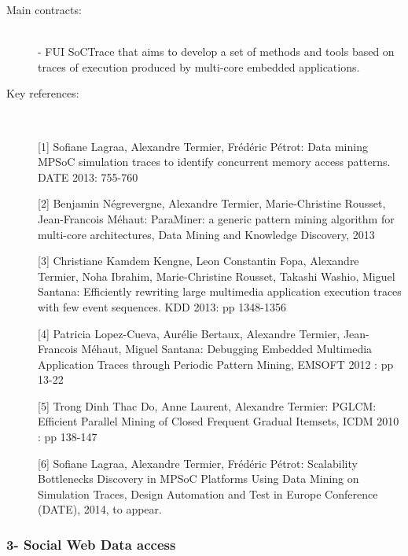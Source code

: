 \begin{description}

\item[Main contracts:] \ \\
- FUI SoCTrace that  aims to develop a set of methods and tools based on traces of execution produced by multi-core embedded applications. 
  
\item[Key references:]~%

[1] Sofiane Lagraa, Alexandre Termier, Fr{\'e}d{\'e}ric P{\'e}trot: Data mining MPSoC simulation traces to identify concurrent memory access patterns. DATE 2013: 755-760

[2] Benjamin N{\'e}grevergne, Alexandre Termier, Marie-Christine Rousset, Jean-Francois M{\'e}haut: ParaMiner: a generic pattern mining algorithm for multi-core architectures, Data Mining and Knowledge Discovery, 2013

[3] Christiane Kamdem Kengne, Leon Constantin Fopa, Alexandre Termier, Noha Ibrahim, Marie-Christine Rousset, Takashi Washio, Miguel Santana: Efficiently rewriting large multimedia application execution traces with few event sequences. KDD 2013: pp 1348-1356

[4] Patricia Lopez-Cueva, Aur{\'e}lie Bertaux, Alexandre Termier, Jean-Francois M{\'e}haut, Miguel Santana: Debugging Embedded Multimedia Application Traces through Periodic Pattern Mining, EMSOFT 2012 : pp 13-22

[5] Trong Dinh Thac Do, Anne Laurent, Alexandre Termier: PGLCM: Efficient Parallel Mining of Closed Frequent Gradual Itemsets, ICDM 2010 : pp 138-147

[6] Sofiane Lagraa, Alexandre Termier, Frédéric Pétrot: Scalability Bottlenecks Discovery in MPSoC Platforms Using Data Mining on Simulation Traces, Design Automation and Test in Europe Conference (DATE), 2014, to appear.

\end{description}

\subsubsection*{3- Social Web Data access}

